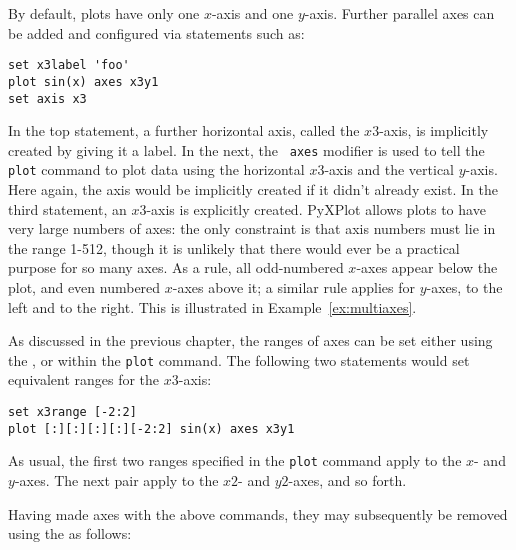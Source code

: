 By default, plots have only one $x$-axis and one $y$-axis. Further parallel
axes can be added and configured via statements such as:

\begin{verbatim}
set x3label 'foo'
plot sin(x) axes x3y1
set axis x3
\end{verbatim}

\noindent In the top statement, a further horizontal axis, called the
$x3$-axis, is implicitly created by giving it a label. In the next, the {\tt
axes} modifier is used to tell the {\tt plot} command to plot data using the
horizontal $x3$-axis and the vertical $y$-axis. Here again, the axis would be
implicitly created if it didn't already exist.  In the third statement, an
$x3$-axis is explicitly created.  PyXPlot allows plots to have very large
numbers of axes: the only constraint is that axis numbers must lie in the range
1-512, though it is unlikely that there would ever be a practical purpose for
so many axes.  As a rule, all odd-numbered $x$-axes appear below the plot, and
even numbered $x$-axes above it; a similar rule applies for $y$-axes, to the
left and to the right.  This is illustrated in Example~\ref{ex:multiaxes}.


As discussed in the previous chapter, the ranges of axes can be set either
using the , or within the {\tt plot} command. The following
two statements would set equivalent ranges for the $x3$-axis:

\begin{verbatim}
set x3range [-2:2]
plot [:][:][:][:][-2:2] sin(x) axes x3y1
\end{verbatim}

\noindent As usual, the first two ranges specified in the {\tt plot} command
apply to the $x$- and $y$-axes. The next pair apply to the $x2$- and $y2$-axes,
and so forth.

\label{axis_removal} Having made axes with the above commands, they may
subsequently be removed using the  as follows:

